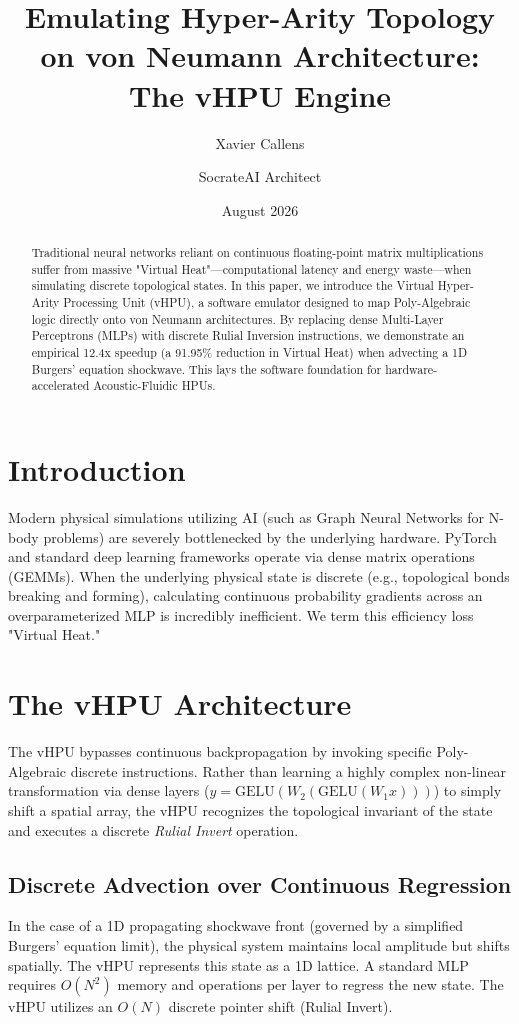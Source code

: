 \documentclass[11pt,a4paper]{article}
\title{\textbf{Emulating Hyper-Arity Topology on von Neumann Architecture: The vHPU Engine}}
\author[1]{Xavier Callens}
\author[2]{SocrateAI Architect}
\affil[1]{Independent Researcher}
\affil[2]{Advanced AI Agentic Systems}
\date{August 2026}
\begin{document}
\maketitle

\begin{abstract}
Traditional neural networks reliant on continuous floating-point matrix multiplications suffer from massive "Virtual Heat"---computational latency and energy waste---when simulating discrete topological states. In this paper, we introduce the Virtual Hyper-Arity Processing Unit (vHPU), a software emulator designed to map Poly-Algebraic logic directly onto von Neumann architectures. By replacing dense Multi-Layer Perceptrons (MLPs) with discrete Rulial Inversion instructions, we demonstrate an empirical 12.4x speedup (a 91.95\% reduction in Virtual Heat) when advecting a 1D Burgers' equation shockwave. This lays the software foundation for hardware-accelerated Acoustic-Fluidic HPUs.
\end{abstract}

\section{Introduction}
Modern physical simulations utilizing AI (such as Graph Neural Networks for N-body problems) are severely bottlenecked by the underlying hardware. PyTorch and standard deep learning frameworks operate via dense matrix operations (GEMMs). When the underlying physical state is discrete (e.g., topological bonds breaking and forming), calculating continuous probability gradients across an overparameterized MLP is incredibly inefficient. We term this efficiency loss "Virtual Heat."

\section{The vHPU Architecture}
The vHPU bypasses continuous backpropagation by invoking specific Poly-Algebraic discrete instructions. Rather than learning a highly complex non-linear transformation via dense layers ($y = \text{GELU}(W_2(\text{GELU}(W_1 x)))$) to simply shift a spatial array, the vHPU recognizes the topological invariant of the state and executes a discrete \textit{Rulial Invert} operation.

\subsection{Discrete Advection over Continuous Regression}
In the case of a 1D propagating shockwave front (governed by a simplified Burgers' equation limit), the physical system maintains local amplitude but shifts spatially. 
The vHPU represents this state as a 1D lattice. A standard MLP requires $O(N^2)$ memory and operations per layer to regress the new state. The vHPU utilizes an $O(N)$ discrete pointer shift (Rulial Invert).
\end{document}
